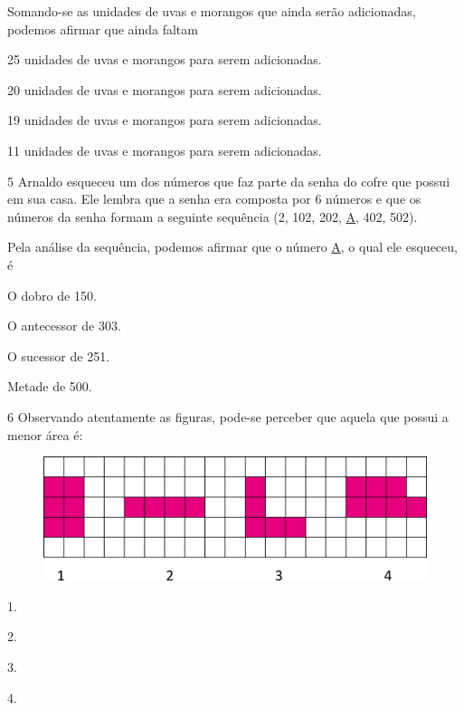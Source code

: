 Somando-se as unidades de uvas e morangos que ainda serão adicionadas, podemos afirmar que ainda faltam

\begin{escolha}
\item
  25 unidades de uvas e morangos para serem adicionadas.
\item
  20 unidades de uvas e morangos para serem adicionadas.
\item
  19 unidades de uvas e morangos para serem adicionadas.
\item
  11 unidades de uvas e morangos para serem adicionadas.
\end{escolha}


\num{5} Arnaldo esqueceu um dos números que faz parte da senha do cofre que
possui em sua casa. Ele lembra que a senha era composta por 6 números e
que os números da senha formam a seguinte sequência (2, 102, 202,
\underline{A}, 402, 502).

Pela análise da sequência, podemos afirmar que o número \underline{A}, o qual ele esqueceu, é

\begin{multicols}{2}
\begin{escolha}
\item
  O dobro de 150.
\item
  O antecessor de 303.
\item
  O sucessor de 251.
\item
  Metade de 500.
\end{escolha}
\end{multicols}

\pagebreak
\num{6} Observando atentamente as figuras, pode-se perceber que aquela que possui a menor área é:

\begin{figure}[htpb!]
\centering
\includegraphics[width=\textwidth]{./media/image115.png}
\end{figure}

\begin{escolha}
\item
  1.
\item
  2.
\item
  3.
\item
  4.
\end{escolha}


